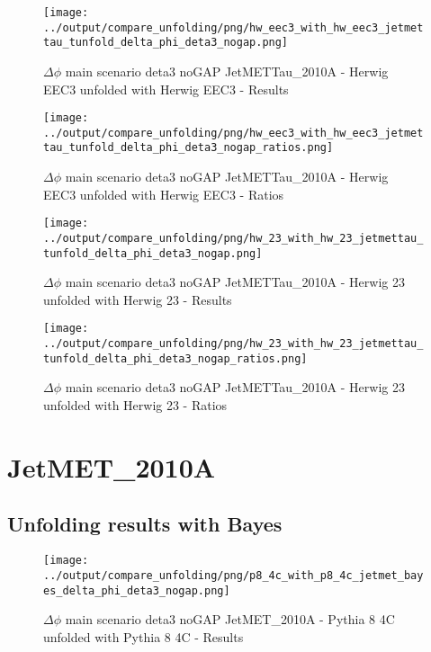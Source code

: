 \documentclass[11pt]{book}
\begin{document}
\begin{figure}[ht]
\centering
\texttt{[image: ../output/compare\_unfolding/png/hw\_eec3\_with\_hw\_eec3\_jetmettau\_tunfold\_delta\_phi\_deta3\_nogap.png]}
\caption{$\Delta\phi$ main scenario deta3 noGAP JetMETTau\_2010A - Herwig EEC3 unfolded with Herwig EEC3 - Results}
\label{hw_eec3_hw_eec3_jetmettau_tunfold_delta_phi_deta3_nogap_a}
\end{figure}

\begin{figure}[ht]
\centering
\texttt{[image: ../output/compare\_unfolding/png/hw\_eec3\_with\_hw\_eec3\_jetmettau\_tunfold\_delta\_phi\_deta3\_nogap\_ratios.png]}
\caption{$\Delta\phi$ main scenario deta3 noGAP JetMETTau\_2010A - Herwig EEC3 unfolded with Herwig EEC3 - Ratios}
\label{hw_eec3_hw_eec3_jetmettau_tunfold_delta_phi_deta3_nogap_b}
\end{figure}

\begin{figure}[ht]
\centering
\texttt{[image: ../output/compare\_unfolding/png/hw\_23\_with\_hw\_23\_jetmettau\_tunfold\_delta\_phi\_deta3\_nogap.png]}
\caption{$\Delta\phi$ main scenario deta3 noGAP JetMETTau\_2010A - Herwig 23 unfolded with Herwig 23 - Results}
\label{hw_23_hw_23_jetmettau_tunfold_delta_phi_deta3_nogap_a}
\end{figure}

\begin{figure}[ht]
\centering
\texttt{[image: ../output/compare\_unfolding/png/hw\_23\_with\_hw\_23\_jetmettau\_tunfold\_delta\_phi\_deta3\_nogap\_ratios.png]}
\caption{$\Delta\phi$ main scenario deta3 noGAP JetMETTau\_2010A - Herwig 23 unfolded with Herwig 23 - Ratios}
\label{hw_23_hw_23_jetmettau_tunfold_delta_phi_deta3_nogap_b}
\end{figure}


\clearpage
\section{JetMET\_2010A}
\subsection{Unfolding results with Bayes}

\begin{figure}[ht]
\centering
\texttt{[image: ../output/compare\_unfolding/png/p8\_4c\_with\_p8\_4c\_jetmet\_bayes\_delta\_phi\_deta3\_nogap.png]}
\caption{$\Delta\phi$ main scenario deta3 noGAP JetMET\_2010A - Pythia 8 4C unfolded with Pythia 8 4C - Results}
\label{p8_p8_jetmet_bayes_delta_phi_deta3_nogap_a}
\end{figure}
\end{document}
